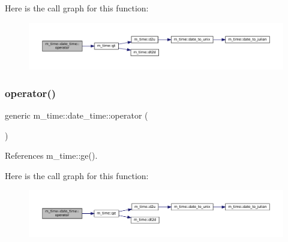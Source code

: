 Here is the call graph for this function\+:\nopagebreak
\begin{figure}[H]
\begin{center}
\leavevmode
\includegraphics[width=350pt]{structm__time_1_1date__time_a1aa01f75ae1f67a4b3202febd56b462f_cgraph}
\end{center}
\end{figure}
\mbox{\label{structm__time_1_1date__time_a3961b17820108c6eb0037d11a03cfcd2}} 
\subsubsection{\texorpdfstring{operator()}{operator()}\hspace{0.1cm}{\footnotesize\ttfamily [5/9]}}
{\footnotesize\ttfamily generic m\+\_\+time\+::date\+\_\+time\+::operator (\begin{DoxyParamCaption}{ }\end{DoxyParamCaption})\hspace{0.3cm}{\ttfamily [private]}}



References m\+\_\+time\+::ge().

Here is the call graph for this function\+:\nopagebreak
\begin{figure}[H]
\begin{center}
\leavevmode
\includegraphics[width=350pt]{structm__time_1_1date__time_a3961b17820108c6eb0037d11a03cfcd2_cgraph}
\end{center}
\end{figure}
\mbox{\label{structm__time_1_1date__time_add9b1c423294accdf967e22fa61a7796}} 
